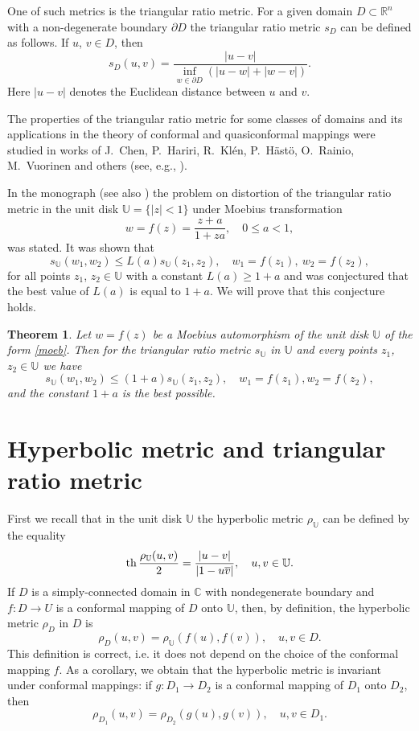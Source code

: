 \documentclass[12pt,a4paper]{amsart}
\newtheorem{theorem}{Theorem}
\def\th{\mathop{\rm th}\nolimits}
\begin{document}
One of such metrics is the triangular ratio metric. For a given domain $D\subset \mathbb{R}^n$ with a non-degenerate boundary $\partial D$ the triangular ratio metric $s_D$ can be defined as follows.
If $u$, $v\in D$, then $$s_D(u,v)=\frac{|u-v|}{\inf_{w\in \partial D}(|u-w|+|w-v|)}.$$ Here $|u-v|$ denotes the Euclidean distance between $u$ and $v$.


The properties of the triangular ratio metric for some classes of domains and its applications in the theory of conformal and quasiconformal mappings were studied in works of J.~Chen, P.~Hariri,  R.~Kl\'en, P.~H\"ast\"o, O.~Rainio, M.~Vuorinen and others (see, e.g., \cite{dknv,ranio,ranio2,ranio_vuor2,ranio_vuor}).

In the monograph \cite[p.455, Problem~(18)]{HKV} (see also \cite[thrm.~1.5]{chkv}) the problem on distortion of the triangular ratio metric in the unit disk  $\mathbb{U}=\{|z|<1\}$ under Moebius transformation
\begin{equation}\label{moeb}
w=f(z)=\frac{z+a}{1+za}, \quad 0\le a<1,
\end{equation}
was stated.
It was shown  that
\begin{equation}\label{1}
s_\mathbb{U}(w_1,w_2)\le L(a)s_\mathbb{U}(z_1,z_2), \quad w_1=f(z_1),\ w_2=f(z_2),
\end{equation}
for all points $z_1$, $z_2\in \mathbb{U}$ with a constant $L(a)\ge 1+a$ and was conjectured that the best value of $L(a)$ is equal to $1+a$.
We will prove that this conjecture holds.

\begin{theorem}\label{th1}
Let $w=f(z)$ be a Moebius automorphism of the unit disk $\mathbb{U}$  of the form \eqref{moeb}. Then for the triangular ratio metric  $s_\mathbb{U}$ in $\mathbb{U}$ and every points $z_1$, $z_2\in \mathbb{U}$ we have
\begin{equation}\label{main}
s_\mathbb{U}(w_1,w_2)\le (1+a)s_\mathbb{U}(z_1,z_2), \quad w_1=f(z_1), w_2=f(z_2),
\end{equation}
and the constant $1+a$ is the best possible.
\end{theorem}



\section{Hyperbolic metric and triangular ratio metric}

First we recall that in the unit disk $\mathbb{U}$ the hyperbolic metric $\rho_\mathbb{U}$ can be defined by the equality
$$
\th\frac{\rho_\mathbb{U}(u,v)}{2}=\frac{|u-v|}{|1-u\overline{v}|}, \quad u,v\in \mathbb{U}.
$$
If $D$ is a simply-connected domain in $\mathbb{C}$ with nondegenerate boundary and $f:D\to U$ is a conformal mapping of $D$ onto $\mathbb{U}$, then, by definition, the hyperbolic metric $\rho_D$ in $D$ is
$$
\rho_D(u,v)=\rho_\mathbb{U}(f(u),f(v)), \quad u,v\in D.
$$
This definition is correct, i.e. it does not depend on the choice of the conformal mapping $f$. As a corollary, we obtain that the hyperbolic metric is invariant under conformal mappings: if $g:D_1\to D_2$ is a conformal mapping of $D_1$ onto $D_2$, then
$$
\rho_{D_1}(u,v)=\rho_{D_2}(g(u),g(v)), \quad  u,v\in D_1.
$$
\end{document}
